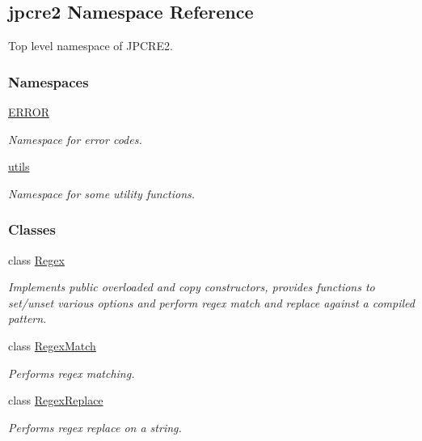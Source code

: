 \hypertarget{namespacejpcre2}{}\subsection{jpcre2 Namespace Reference}
\label{namespacejpcre2}


Top level namespace of J\+P\+C\+R\+E2.  


\subsubsection*{Namespaces}
\begin{DoxyCompactItemize}
\item 
 \hyperlink{namespacejpcre2_1_1ERROR}{E\+R\+R\+OR}
\begin{DoxyCompactList}\small\item\em Namespace for error codes. \end{DoxyCompactList}\item 
 \hyperlink{namespacejpcre2_1_1utils}{utils}
\begin{DoxyCompactList}\small\item\em Namespace for some utility functions. \end{DoxyCompactList}\end{DoxyCompactItemize}
\subsubsection*{Classes}
\begin{DoxyCompactItemize}
\item 
class \hyperlink{classjpcre2_1_1Regex}{Regex}
\begin{DoxyCompactList}\small\item\em Implements public overloaded and copy constructors, provides functions to set/unset various options and perform regex match and replace against a compiled pattern. \end{DoxyCompactList}\item 
class \hyperlink{classjpcre2_1_1RegexMatch}{Regex\+Match}
\begin{DoxyCompactList}\small\item\em Performs regex matching. \end{DoxyCompactList}\item 
class \hyperlink{classjpcre2_1_1RegexReplace}{Regex\+Replace}
\begin{DoxyCompactList}\small\item\em Performs regex replace on a string. \end{DoxyCompactList}\end{DoxyCompactItemize}
